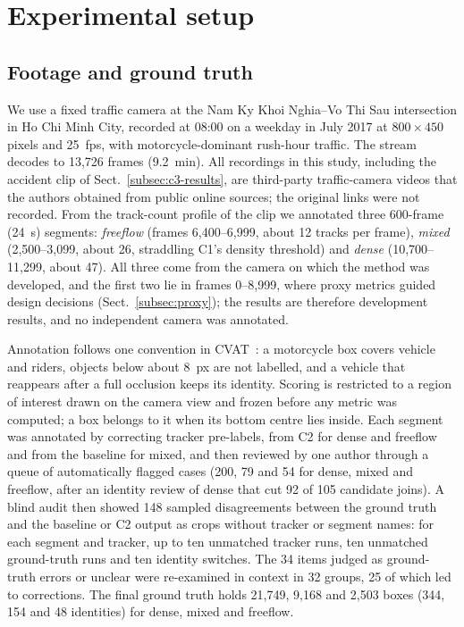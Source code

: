 \documentclass[twocolumn]{svjour3}
\begin{document}
\section{Experimental setup}\label{sec:setup}

\subsection{Footage and ground truth}\label{subsec:data}

We use a fixed traffic camera at the Nam Ky Khoi Nghia--Vo Thi Sau intersection
in Ho Chi Minh City, recorded at 08:00 on a weekday in July 2017 at
$800\times450$ pixels and 25~fps, with motorcycle-dominant rush-hour traffic. The
stream decodes to 13,726 frames (9.2~min).
All recordings in this study, including the accident clip of
Sect.~\ref{subsec:c3-results}, are third-party traffic-camera videos that the
authors obtained from public online sources; the original links were not
recorded.
From the track-count profile of the clip we annotated three 600-frame (24~s)
segments: \emph{freeflow} (frames 6,400--6,999, about 12 tracks per frame),
\emph{mixed} (2,500--3,099, about 26, straddling C1's density threshold) and
\emph{dense} (10,700--11,299, about 47). All three come from the camera on which
the method was developed, and the first two lie in frames 0--8,999, where proxy
metrics guided design decisions (Sect.~\ref{subsec:proxy}); the results are
therefore development results, and no independent camera was annotated.

Annotation follows one convention in CVAT~\cite{CVAT}: a motorcycle box covers
vehicle and riders, objects below about 8~px are not labelled, and a vehicle
that reappears after a full occlusion keeps its identity. Scoring is restricted
to a region of interest drawn on the camera view and frozen before any metric
was computed; a box belongs to it when its bottom centre lies inside. Each
segment was annotated by correcting tracker pre-labels, from C2 for dense and
freeflow and from the baseline for mixed, and then reviewed by one author
through a queue of automatically flagged cases (200, 79 and 54 for dense, mixed
and freeflow, after an identity review of dense that cut 92 of 105 candidate
joins). A blind audit then showed 148 sampled
disagreements between the ground truth and the baseline or C2 output as crops
without tracker or segment names: for each segment and tracker, up to ten
unmatched tracker runs, ten unmatched ground-truth runs and ten identity
switches. The 34 items judged as ground-truth errors or unclear were
re-examined in context in 32 groups, 25 of which led to corrections. The final
ground truth holds 21,749, 9,168 and 2,503 boxes (344, 154 and 48 identities)
for dense, mixed and freeflow.
\end{document}

